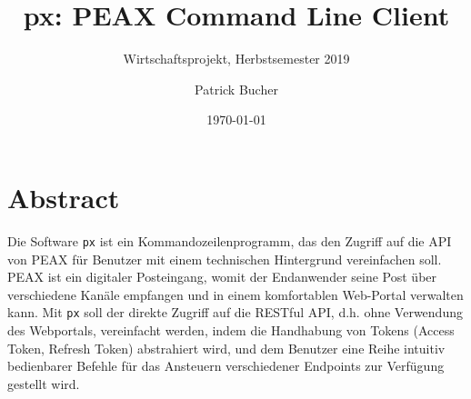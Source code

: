 \author{Patrick Bucher}
\title{px: PEAX Command Line Client}
\subtitle{Wirtschaftsprojekt, Herbstsemester 2019}
\date{\today}
\maketitle

\section*{Abstract}

Die Software \texttt{px} ist ein Kommandozeilenprogramm, das den Zugriff auf die API von PEAX für Benutzer mit einem technischen Hintergrund vereinfachen soll. PEAX ist ein digitaler Posteingang, womit der Endanwender seine Post über verschiedene Kanäle empfangen und in einem komfortablen Web-Portal verwalten kann. Mit \texttt{px} soll der direkte Zugriff auf die RESTful API, d.h. ohne Verwendung des Webportals, vereinfacht werden, indem die Handhabung von Tokens (Access Token, Refresh Token) abstrahiert wird, und dem Benutzer eine Reihe intuitiv bedienbarer Befehle für das Ansteuern verschiedener Endpoints zur Verfügung gestellt wird.
